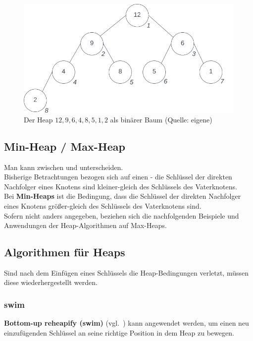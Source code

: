 \begin{figure}
    \begin{center}
        \includegraphics[scale=0.4]{chapters/Datenstrukturen und Algorithmen/img/heaptree}
        \caption{Der Heap  $12, 9, 6, 4, 8, 5, 1, 2$ als binärer Baum (Quelle: eigene)}
        \label{fig:heaptree}
    \end{center}
\end{figure}

\subsection{Min-Heap / Max-Heap}
Man kann zwischen  und  unterscheiden.\\
Bisherige Betrachtungen bezogen sich auf einen  - die Schlüssel der direkten Nachfolger eines Knotens sind kleiner-gleich des Schlüssels des Vaterknotens.\\
Bei \textbf{Min-Heaps} ist die Bedingung, dass die Schlüssel der direkten Nachfolger eines Knotens größer-gleich des Schlüssels des Vaterknotens sind.\\
Sofern nicht anders angegeben, beziehen sich die nachfolgenden Beispiele und Anwendungen der Heap-Algorithmen auf Max-Heaps.

\subsection{Algorithmen für Heaps}
Sind nach dem Einfügen eines Schlüssels die Heap-Bedingungen verletzt, müssen diese wiederhergestellt werden.

\subsubsection{swim}

\textbf{Bottom-up reheapify (swim)} (vgl.~\cite[315]{SW11}) kann angewendet werden, um einen neu einzufügenden Schlüssel an seine richtige Position in dem Heap zu bewegen.

